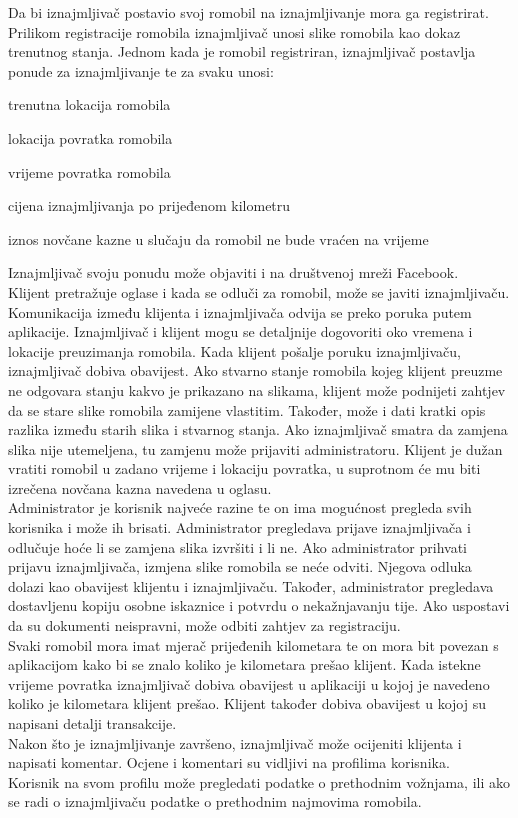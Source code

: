 		\indent Da bi iznajmljivač postavio svoj romobil na iznajmljivanje mora ga registrirat. Prilikom registracije romobila iznajmljivač unosi slike romobila kao dokaz trenutnog stanja. Jednom kada je romobil registriran, iznajmljivač postavlja ponude za iznajmljivanje te za svaku unosi:
		\begin{packed_item} 
			\item trenutna lokacija romobila
			\item lokacija povratka romobila
			\item vrijeme povratka romobila
			\item cijena iznajmljivanja po prijeđenom kilometru
			\item iznos novčane kazne u slučaju da romobil ne bude vraćen na vrijeme
		\end{packed_item}
		Iznajmljivač svoju ponudu može objaviti i na društvenoj mreži Facebook.\\
		\indent Klijent pretražuje oglase i kada se odluči za romobil, može se javiti iznajmljivaču. Komunikacija između klijenta i iznajmljivača odvija se preko poruka putem aplikacije. Iznajmljivač i klijent mogu se detaljnije dogovoriti oko vremena i lokacije preuzimanja romobila. Kada klijent pošalje poruku iznajmljivaču, iznajmljivač dobiva obavijest. Ako stvarno stanje romobila kojeg klijent preuzme ne odgovara stanju kakvo je prikazano na slikama, klijent može podnijeti zahtjev da se stare slike romobila zamijene vlastitim. Također, može i dati kratki opis razlika između starih slika i stvarnog stanja. Ako iznajmljivač smatra da zamjena slika nije utemeljena, tu zamjenu može prijaviti administratoru. Klijent je dužan vratiti romobil u zadano vrijeme i lokaciju povratka, u suprotnom će mu biti izrečena novčana kazna navedena u oglasu.  \\
		\indent Administrator je korisnik najveće razine te on ima mogućnost pregleda svih korisnika i može ih brisati. Administrator pregledava prijave iznajmljivača i odlučuje hoće li se zamjena slika izvršiti i li ne. Ako administrator prihvati prijavu iznajmljivača, izmjena slike romobila se neće odviti. Njegova odluka dolazi kao obavijest klijentu i iznajmljivaču. Također, administrator pregledava dostavljenu kopiju osobne iskaznice i potvrdu o nekažnjavanju tije. Ako uspostavi da su dokumenti neispravni, može odbiti zahtjev za registraciju.\\
		\indent Svaki romobil mora imat mjerač prijeđenih kilometara te on mora bit povezan s aplikacijom kako bi se znalo koliko je kilometara prešao klijent. Kada istekne vrijeme povratka iznajmljivač dobiva obavijest u aplikaciji u kojoj je navedeno koliko je kilometara klijent prešao. Klijent također dobiva obavijest u kojoj su napisani detalji transakcije. \\
		\indent Nakon što je iznajmljivanje završeno, iznajmljivač može ocijeniti klijenta i napisati komentar. Ocjene i komentari su vidljivi na profilima korisnika. \\
		\indent Korisnik na svom profilu može pregledati podatke o prethodnim vožnjama, ili ako se radi o iznajmljivaču podatke o prethodnim najmovima romobila.\\ \\
		
